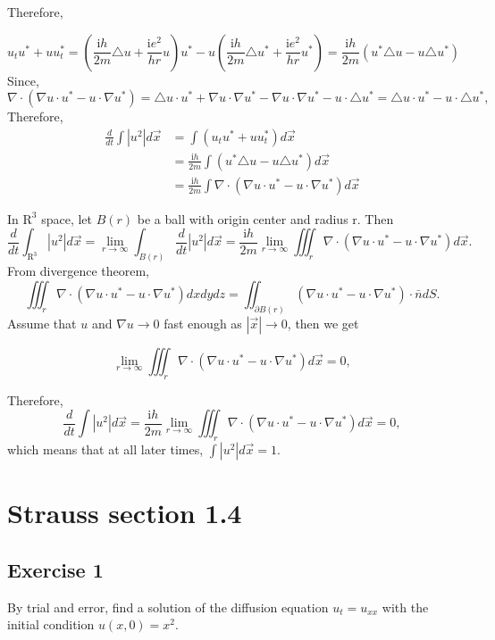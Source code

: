 \documentclass{article}
\begin{document}
		Therefore,

			\[u_{t}u^*+uu_{t}^*=(\frac{\mathrm{i}h}{2m}\triangle u+\frac{\mathrm{i}e^2}{hr}u)u^*-u(\frac{\mathrm{i}h}{2m}\triangle u^*+\frac{\mathrm{i}e^2}{hr}u^*)= \frac{\mathrm{i}h}{2m} (u^*\triangle u -u\triangle u^*) \]
			Since, \[\nabla \cdot (\nabla u \cdot u^* -u\cdot \nabla u^*)= \triangle u \cdot u^*+ \nabla u\cdot \nabla u^*- \nabla u\cdot \nabla u^*- u\cdot\triangle u^*=\triangle u \cdot u^*-u\cdot\triangle u^*,\]
			Therefore,
	\begin{align*}
		\frac{d}{dt}\int \left | u^2 \right | d \vec{x }&=\int(u_{t}u^*+uu_{t}^*)  d \vec{x } \\
		&= \frac{\mathrm{i}h}{2m}\int(u^*\triangle u -u\triangle u^*)d \vec{x } \\
		&=\frac{\mathrm{i}h}{2m}\int \nabla \cdot (\nabla u \cdot u^* -u\cdot \nabla u^*)d \vec{x }
	\end{align*}

            In $\mathrm{R}^3$ space, let $B(r)$ be a ball with origin center and radius r.
			Then \[ \frac{d}{dt}\int_{\mathrm{R^3} }^{}  \left | u^2 \right | d \vec{x }= \lim_{r \to \infty}\int_{B(r)}\frac{d}{dt} \left | u^2 \right | d \vec{x }= \frac{\mathrm{i}h}{2m}\lim_{r \to \infty}\iiint_{r}^{} \nabla \cdot (\nabla u \cdot u^* -u\cdot \nabla u^*)d \vec{x }.\]
			From divergence theorem,
			\[\iiint_{r}^{} \nabla \cdot (\nabla u \cdot u^* -u\cdot \nabla u^*)dx dy dz= \iint_{\partial B(r)}^{}(\nabla u \cdot u^* -u\cdot \nabla u^*) \cdot \bar{n} dS.	\]
			Assume that $u$ and $\nabla u \to 0$ fast enough as $\left | \vec{x} \right | \to 0$, then we get
		
		\[ \lim_{r \to \infty}\iiint_{r}^{} \nabla \cdot (\nabla u \cdot u^* -u\cdot \nabla u^*)d \vec{x } =0,\]

		Therefore, \[ \frac{d}{dt}\int \left | u^2 \right | d \vec{x }=\frac{\mathrm{i}h}{2m}\lim_{r \to \infty}\iiint_{r}^{} \nabla \cdot (\nabla u \cdot u^* -u\cdot \nabla u^*)d \vec{x }=0,\]
			which means that at all later times, $ \int \left | u^2 \right | d \vec{x } =1$.
		
\section{Strauss section 1.4}
\subsection{Exercise 1}
By trial and error, find a solution of the diffusion equation $u_t=u_{xx}$ with the initial condition $u(x,0)=x^2.$
		
\end{document}
